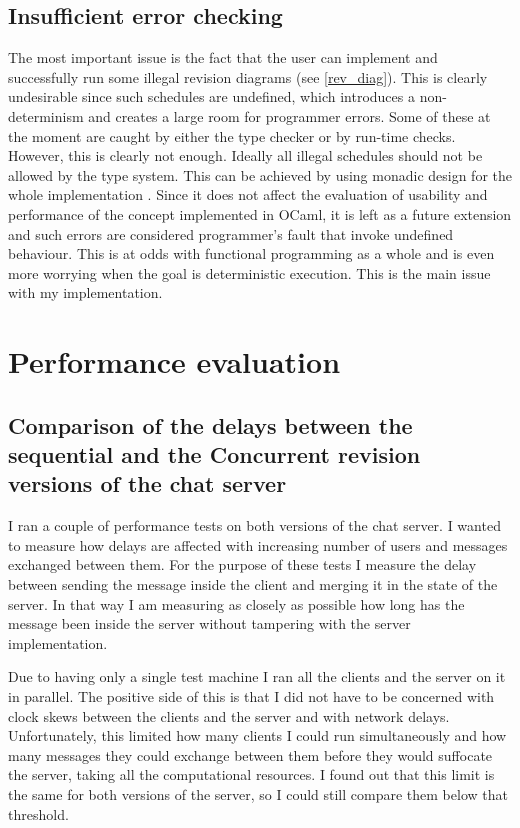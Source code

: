 \documentclass[12pt,twoside,notitlepage]{report}
\begin{document}
\subsection{Insufficient error checking}
\label{problems}
The most important issue is the fact that the user can implement and successfully run some illegal revision diagrams (see \ref{rev_diag}). This is clearly undesirable since such schedules are undefined, which introduces a non-determinism and creates a large room for programmer errors. Some of these at the moment are caught by either the type checker or by run-time checks. However, this is clearly not enough. Ideally all illegal schedules should not be allowed by the type system. This can be achieved by using monadic design for the whole implementation \cite{haskell}. Since it does not affect the evaluation of usability and performance of the concept implemented in OCaml, it is left as a future extension and such errors are considered programmer's fault that invoke undefined behaviour. This is at odds with functional programming as a whole and is even more worrying when the goal is deterministic execution. This is the main issue with my implementation.


\section{Performance evaluation}
\label{perf_eval}
\subsection{Comparison of the delays between the sequential and the Concurrent revision versions of the chat server}

I ran a couple of performance tests on both versions of the chat server. I wanted to measure how delays are affected with increasing number of users and messages exchanged between them. For the purpose of these tests I measure the delay between sending the message inside the client and merging it in the state of the server. In that way I am measuring as closely as possible how long has the message been inside the server without tampering with the server implementation.

Due to having only a single test machine I ran all the clients and the server on it in parallel. The positive side of this is that I did not have to be concerned with clock skews between the clients and the server and with network delays. Unfortunately, this limited how many clients I could run simultaneously and how many messages they could exchange between them before they would suffocate the server, taking all the computational resources. I found out that this limit is the same for both versions of the server, so I could still compare them below that threshold.
\end{document}

